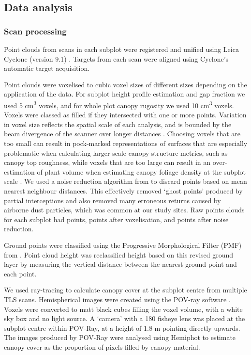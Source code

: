 \documentclass[11pt,a4paper]{article}
\newcommand{\textapprox}{\raisebox{0.5ex}{\texttildelow}}  %
\begin{document}
\subsection{Data analysis}

\subsubsection{Scan processing}

Point clouds from scans in each subplot were registered and unified using Leica Cyclone (version 9.1) \citep{Cyclone}. Targets from each scan were aligned using Cyclone's automatic target acquisition. 

Point clouds were voxelised to cubic voxel sizes of different sizes depending on the application of the data. For subplot height profile estimation and gap fraction we used 5 cm\textsuperscript{3} voxels, and for whole plot canopy rugosity we used 10 cm\textsuperscript{3} voxels. Voxels were classed as filled if they intersected with one or more points. Variation in voxel size reflects the spatial scale of each analysis, and is bounded by the beam divergence of the scanner over longer distances \citep{}. Choosing voxels that are too small can result in pock-marked representations of surfaces that are especially problematic when calculating larger scale canopy structure metrics, such as canopy top roughness, while voxels that are too large can result in an over-estimation of plant volume when estimating canopy foliage density at the subplot scale \citep{Cifuentes2014}. We used a noise reduction algorithm from \citet{} to discard points based on mean nearest neighbour distances. This effectively removed `ghost points' produced by partial interceptions and also removed many erroneous returns caused by airborne dust particles, which was common at our study sites. Raw points clouds for each subplot had \textapprox{}\rawpt{} points, \textapprox{}\voxelpt{} points after voxelisation, and \textapprox{}\subpt{} points after noise reduction.

Ground points were classified using the Progressive Morphological Filter (PMF) from \citet{Zhang2003}. Point cloud height was reclassified height based on this revised ground layer by measuring the vertical distance between the nearest ground point and each point.

We used ray-tracing to calculate canopy cover at the subplot centre from multiple TLS scans. Hemispherical images were created using the POV-ray software \citep{}. Voxels were converted to matt black cubes filling the voxel volume, with a white sky box and no light source. A `camera' with a 180\textdegree{} fisheye lens was placed at the subplot centre within POV-Ray, at a height of 1.8 m pointing directly upwards. The images produced by POV-Ray were analysed using Hemiphot \citep{Steege} to estimate canopy cover as the proportion of pixels filled by canopy material.
\end{document}
